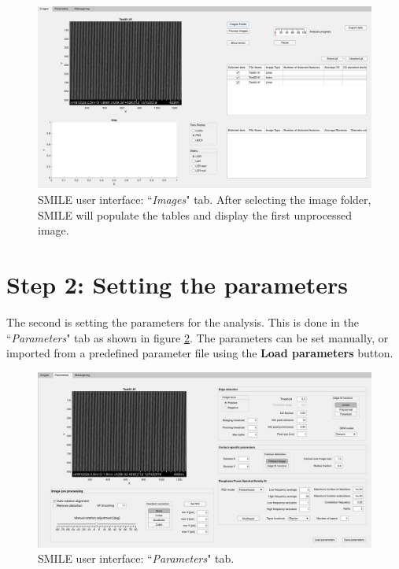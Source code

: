 \documentclass[12pt, a4paper, openany]{report}
\begin{document}
\begin{figure}[hbtp]
	\includegraphics[width=\textwidth]{figures/GUI_01A.png}
	\caption{SMILE user interface: ``\emph{Images}" tab. After selecting the image folder, SMILE will populate the tables and display the first unprocessed image.}
	\label{fig:GUI_01A}
\end{figure}
\section{Step 2: Setting the parameters}
The second is setting the parameters for the analysis. This is done in the ``\emph{Parameters}" tab as shown in figure \ref{fig:GUI_02A}. The parameters can be set manually, or imported from a predefined parameter file using the \textbf{Load parameters} button.
\begin{figure}[thbp]
	\includegraphics[width=\textwidth]{figures/GUI_02A.png}
	\caption{SMILE user interface: ``\emph{Parameters}" tab.}
	\label{fig:GUI_02A}
\end{figure}
\end{document}
